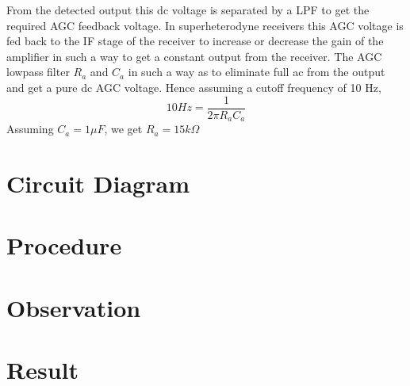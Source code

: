 From the detected output this dc voltage is separated by a LPF to get the required AGC feedback voltage. In superheterodyne receivers this AGC voltage is fed back to the IF stage of the receiver to increase or decrease the gain of the amplifier in such a way to get a constant output from the receiver. The AGC lowpass filter $R_a$ and $C_a$ in such a way as to eliminate full ac from the output and get a pure dc AGC voltage. 
Hence assuming a cutoff frequency of 10 Hz,
\begin{equation}
10 Hz= \frac{1}{2\pi R_aC_a}
\end{equation}
\noindent Assuming $C_a=1 \mu F$, we get $R_a=15 k \Omega$

\section*{Circuit Diagram}
\section*{Procedure}
\section*{Observation}
\section*{Result}

